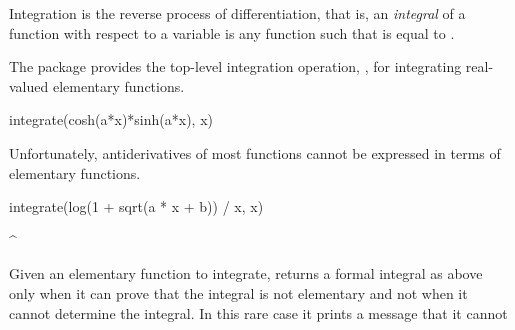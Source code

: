 {{{{{{{{{{{{{%
%
Integration is the reverse process of differentiation, that is,
an {\it integral} of a function  with respect to a variable
 is any function  such that 
is equal to .
\begin{xtc}
\begin{xtccomment}
The package  provides the top-level
integration operation, ,
for integrating real-valued elementary functions.
\end{xtccomment}
\begin{spadsrc}
integrate(cosh(a*x)*sinh(a*x), x)
\end{spadsrc}
\begin{TeXOutput}
\begin{fricasmath}{1}
%
\end{fricasmath}
\end{TeXOutput}
\end{xtc}
\begin{xtc}
\begin{xtccomment}
Unfortunately, antiderivatives of most functions cannot be expressed in
terms of elementary functions.
\end{xtccomment}
\begin{spadsrc}
integrate(log(1 + sqrt(a * x + b)) / x, x)
\end{spadsrc}
\begin{TeXOutput}
\begin{fricasmath}{2}
\int^{} \TIMES {}%
\end{fricasmath}
\end{TeXOutput}
\end{xtc}
Given an elementary function to integrate, \Language{} returns a formal
integral as above only when it can prove that the integral is not
elementary and not when it cannot determine the integral.
In this rare case it prints a message that it cannot
}}}}}}}}}}}}}
